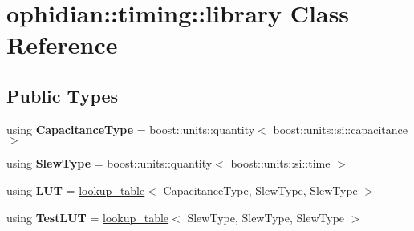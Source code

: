 \hypertarget{classophidian_1_1timing_1_1library}{\section{ophidian\-:\-:timing\-:\-:library Class Reference}
\label{classophidian_1_1timing_1_1library}
}
\subsection*{Public Types}
\begin{DoxyCompactItemize}
\item 
\hypertarget{classophidian_1_1timing_1_1library_a5d7d09d93a28917cf3467cf0310f0d13}{using {\bfseries Capacitance\-Type} = boost\-::units\-::quantity$<$ boost\-::units\-::si\-::capacitance $>$}\label{classophidian_1_1timing_1_1library_a5d7d09d93a28917cf3467cf0310f0d13}

\item 
\hypertarget{classophidian_1_1timing_1_1library_a4a2470c263f4abaa7bcb9d305568a4ca}{using {\bfseries Slew\-Type} = boost\-::units\-::quantity$<$ boost\-::units\-::si\-::time $>$}\label{classophidian_1_1timing_1_1library_a4a2470c263f4abaa7bcb9d305568a4ca}

\item 
\hypertarget{classophidian_1_1timing_1_1library_ac707d167a8df758c8edf1465f2b4c334}{using {\bfseries L\-U\-T} = \hyperlink{classophidian_1_1timing_1_1lookup__table}{lookup\-\_\-table}$<$ Capacitance\-Type, Slew\-Type, Slew\-Type $>$}\label{classophidian_1_1timing_1_1library_ac707d167a8df758c8edf1465f2b4c334}

\item 
\hypertarget{classophidian_1_1timing_1_1library_a0713b88f915bd0ee8776e69325564cba}{using {\bfseries Test\-L\-U\-T} = \hyperlink{classophidian_1_1timing_1_1lookup__table}{lookup\-\_\-table}$<$ Slew\-Type, Slew\-Type, Slew\-Type $>$}\label{classophidian_1_1timing_1_1library_a0713b88f915bd0ee8776e69325564cba}

\end{DoxyCompactItemize}
